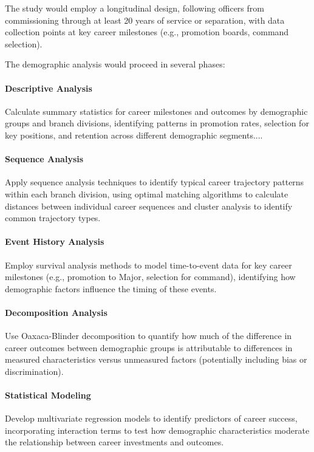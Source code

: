 \documentclass[../main.tex]{subfiles}
\begin{document}
The study would employ a longitudinal design, following officers from commissioning through at least 20 years of service or separation, with data collection points at key career milestones (e.g., promotion boards, command selection).


The demographic analysis would proceed in several phases:

\paragraph{Descriptive Analysis} Calculate summary statistics for career milestones and outcomes by demographic groups and branch divisions, identifying patterns in promotion rates, selection for key positions, and retention across different demographic segments.... \paragraph{Sequence Analysis} Apply sequence analysis techniques to identify typical career trajectory patterns within each branch division, using optimal matching algorithms to calculate distances between individual career sequences and cluster analysis to identify common trajectory types.

\paragraph{Event History Analysis} Employ survival analysis methods to model time-to-event data for key career milestones (e.g., promotion to Major, selection for command), identifying how demographic factors influence the timing of these events.

\paragraph{Decomposition Analysis} Use Oaxaca-Blinder decomposition to quantify how much of the difference in career outcomes between demographic groups is attributable to differences in measured characteristics versus unmeasured factors (potentially including bias or discrimination).

\paragraph{Statistical Modeling} Develop multivariate regression models to identify predictors of career success, incorporating interaction terms to test how demographic characteristics moderate the relationship between career investments and outcomes.
\end{document}
